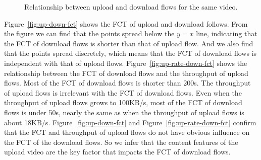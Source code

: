 \begin{figure}[t]
\centering
{}
\hspace{1em}%
	\hspace{1em}%
\caption{Relationship between upload and download flows for the same video.}
\label{fig:relationship-up-down} %
\termspace
\end{figure}



Figure~\ref{fig:up-down-fct} shows the FCT of upload and download follows. From the figure we can find that the points spread below the $y = x$ line, indicating that the FCT of download flows is shorter than that of upload flow. And we also find that the points spread discretely, which means that the FCT of download flows is independent with that of upload flows. Figure~\ref{fig:up-rate-down-fct} shows the relationship between the FCT of download flows and the throughput of upload flows. Most of the FCT of download flows is shorter than 200s. The throughput of upload flows is irrelevant with the FCT of download flows. Even when the throughput of upload flows grows to 100KB/s, most of the FCT of download flows is under 50s, nearly the same as when the throughput of upload flows is about 18KB/s. Figure~\ref{fig:up-down-fct} and Figure~\ref{fig:up-rate-down-fct} confirm that the FCT and throughput of upload flows do not have obvious influence on the FCT of the download flows. So we infer that the content features of the upload video are the key factor that impacts the FCT of download flows. 


